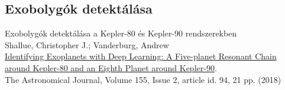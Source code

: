 \subsection{Exobolygók detektálása}

\begin{frame}{}
    \centering
    \Huge{Exobolygók detektálása a Kepler-80 és Kepler-90 rendszerekben}\\
    \vspace*{1cm}
    \large{Shallue, Christopher J.; Vanderburg, Andrew \\ \href{https://iopscience.iop.org/article/10.3847/1538-3881/aa9e09}{Identifying Exoplanets with Deep Learning: A Five-planet Resonant Chain around Kepler-80 and an Eighth Planet around Kepler-90}. \\ The Astronomical Journal, Volume 155, Issue 2, article id. 94, 21 pp. (2018)}
\end{frame}

